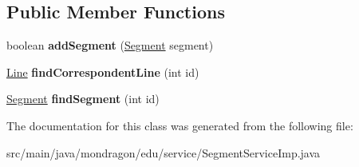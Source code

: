 \subsection*{Public Member Functions}
\begin{DoxyCompactItemize}
\item 
\mbox{\label{classmondragon_1_1edu_1_1service_1_1_segment_service_imp_ad500fecd555507c38f9ab8a6090dd056}} 
boolean {\bfseries add\+Segment} (\mbox{\hyperlink{classmondragon_1_1edu_1_1clases_1_1_segment}{Segment}} segment)
\item 
\mbox{\label{classmondragon_1_1edu_1_1service_1_1_segment_service_imp_af790620ac8a5288baba32884d6a4042e}} 
\mbox{\hyperlink{classmondragon_1_1edu_1_1clases_1_1_line}{Line}} {\bfseries find\+Correspondent\+Line} (int id)
\item 
\mbox{\label{classmondragon_1_1edu_1_1service_1_1_segment_service_imp_ad25438b5e05c66cf4651c591042fd161}} 
\mbox{\hyperlink{classmondragon_1_1edu_1_1clases_1_1_segment}{Segment}} {\bfseries find\+Segment} (int id)
\end{DoxyCompactItemize}


The documentation for this class was generated from the following file\+:\begin{DoxyCompactItemize}
\item 
src/main/java/mondragon/edu/service/Segment\+Service\+Imp.\+java\end{DoxyCompactItemize}
